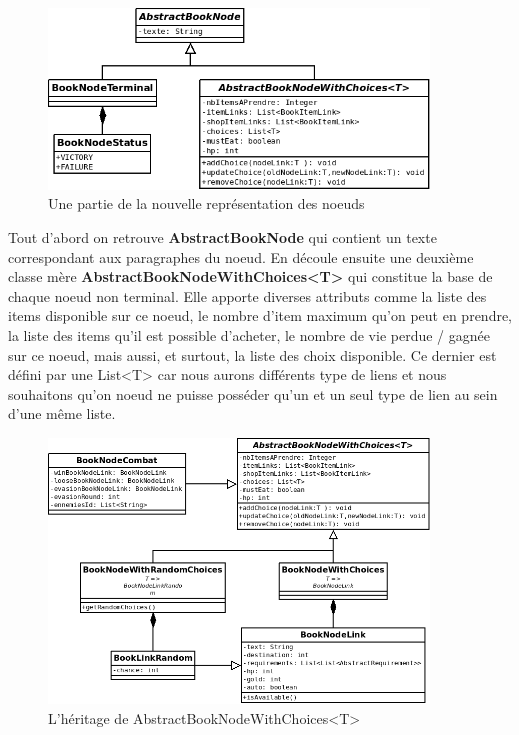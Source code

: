 			\begin{figure}[H]
				\centering\includegraphics[width=0.90\textwidth, keepaspectratio]{img/BookNode1.png}
				\caption{Une partie de la nouvelle représentation des noeuds}
				\label{fig:BookNode}
			\end{figure}

			Tout d'abord on retrouve \textbf{AbstractBookNode} qui contient un texte correspondant aux paragraphes du noeud. En découle ensuite une deuxième classe mère \textbf{AbstractBookNodeWithChoices<T>} qui constitue la base de chaque noeud non terminal. Elle apporte diverses attributs comme la liste des items disponible sur ce noeud, le nombre d'item maximum qu'on peut en prendre, la liste des items qu'il est possible d'acheter, le nombre de vie perdue / gagnée sur ce noeud, mais aussi, et surtout, la liste des choix disponible. Ce dernier est défini par une List<T> car nous aurons différents type de liens et nous souhaitons qu'on noeud ne puisse posséder qu'un et un seul type de lien au sein d'une même liste.

			\begin{figure}[H]
				\centering\includegraphics[width=0.90\textwidth, keepaspectratio]{img/BookNode2.png}
				\caption{L'héritage de AbstractBookNodeWithChoices<T>}
				\label{fig:BookNode}
			\end{figure}


